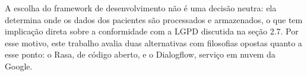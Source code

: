 \documentclass[12pt,a4paper]{extarticle}
\begin{document}
%

A escolha do framework de desenvolvimento não é uma decisão neutra: ela determina onde os dados dos pacientes são processados e armazenados, o que tem implicação direta sobre a conformidade com a LGPD discutida na seção 2.7. Por esse motivo, este trabalho avalia duas alternativas com filosofias opostas quanto a esse ponto: o Rasa, de código aberto, e o Dialogflow, serviço em nuvem da Google.
\end{document}
